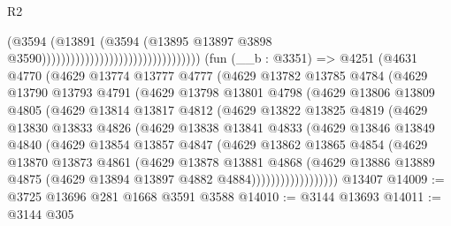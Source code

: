 \begin{lexlean}{R2}
\begin{coremodule}
                                                              (@3594
                                                                (@13891
                                                                  (@3594
                                                                    (@13895
                                                                      @13897
                                                                      @3898
                                                                      @3590)))))))))))))))))))))))))))))))))
    (fun (__b : @3351) =>
    @4251
      (@4631
        @4770
        (@4629
          @13774
          @13777
          @4777
          (@4629
            @13782
            @13785
            @4784
            (@4629
              @13790
              @13793
              @4791
              (@4629
                @13798
                @13801
                @4798
                (@4629
                  @13806
                  @13809
                  @4805
                  (@4629
                    @13814
                    @13817
                    @4812
                    (@4629
                      @13822
                      @13825
                      @4819
                      (@4629
                        @13830
                        @13833
                        @4826
                        (@4629
                          @13838
                          @13841
                          @4833
                          (@4629
                            @13846
                            @13849
                            @4840
                            (@4629
                              @13854
                              @13857
                              @4847
                              (@4629
                                @13862
                                @13865
                                @4854
                                (@4629
                                  @13870
                                  @13873
                                  @4861
                                  (@4629
                                    @13878
                                    @13881
                                    @4868
                                    (@4629
                                      @13886
                                      @13889
                                      @4875
                                      (@4629 @13894 @13897 @4882 @4884))))))))))))))))))
    @13407
@14009 := @3725 @13696 @281 @1668 @3591 @3588
@14010 := @3144 @13693
@14011 := @3144 @305

\end{coremodule}
\end{lexlean}
